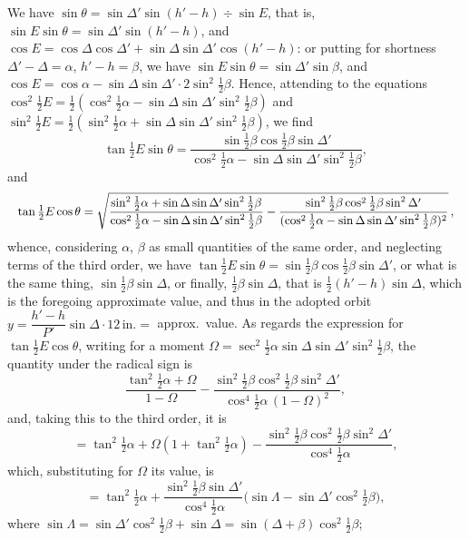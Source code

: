 \documentclass[11pt]{article}
\begin{document}
We have $\sin\theta = \sin\Delta'\sin(h'-h)\div\sin E$, that is,
$\sin E\sin\theta = \sin\Delta'\sin(h'-h)$, and
$\cos E = \cos\Delta\cos\Delta' + \sin\Delta\sin\Delta'\cos(h'-h)$: or
putting for shortness $\Delta'-\Delta = \alpha$, $h'-h = \beta$, we have
$\sin E\sin\theta = \sin\Delta'\sin\beta$, and
$\cos E = \cos\alpha - \sin\Delta\sin\Delta'\cdot 2\sin^{2}\tfrac{1}{2}\beta$.
Hence, attending to the equations
$\cos^{2}\tfrac{1}{2}E = \tfrac{1}{2}(\cos^{2}\tfrac{1}{2}\alpha - \sin\Delta\sin\Delta'\sin^{2}\tfrac{1}{2}\beta)$
and
$\sin^{2}\tfrac{1}{2}E = \tfrac{1}{2}(\sin^{2}\tfrac{1}{2}\alpha + \sin\Delta\sin\Delta'\sin^{2}\tfrac{1}{2}\beta)$,
we find
\[
\tan\tfrac{1}{2}E\sin\theta = \frac{\sin\tfrac{1}{2}\beta\cos\tfrac{1}{2}\beta\sin\Delta'}{\cos^{2}\tfrac{1}{2}\alpha - \sin\Delta\sin\Delta'\sin^{2}\tfrac{1}{2}\beta},
\]
and
\[
\resizebox{\textwidth}{!}{$\displaystyle
\tan\tfrac{1}{2}E\cos\theta = \sqrt{\frac{\sin^{2}\tfrac{1}{2}\alpha + \sin\Delta\sin\Delta'\sin^{2}\tfrac{1}{2}\beta}{\cos^{2}\tfrac{1}{2}\alpha - \sin\Delta\sin\Delta'\sin^{2}\tfrac{1}{2}\beta} - \frac{\sin^{2}\tfrac{1}{2}\beta\cos^{2}\tfrac{1}{2}\beta\sin^{2}\Delta'}{(\cos^{2}\tfrac{1}{2}\alpha - \sin\Delta\sin\Delta'\sin^{2}\tfrac{1}{2}\beta)^{2}}}\,,$}
\]
whence, considering $\alpha$, $\beta$ as small quantities of the same
order, and neglecting terms of the third order, we have
$\tan\tfrac{1}{2}E\sin\theta = \sin\tfrac{1}{2}\beta\cos\tfrac{1}{2}\beta\sin\Delta'$,
or what is the same thing, $\sin\tfrac{1}{2}\beta\sin\Delta$, or finally,
$\tfrac{1}{2}\beta\sin\Delta$, that is $\tfrac{1}{2}(h'-h)\sin\Delta$,
which is the foregoing approximate value, and thus in the adopted orbit
$y = \dfrac{h'-h}{P'}\sin\Delta\cdot 12\,\text{in.} = $ approx.\ value. As
regards the expression for $\tan\tfrac{1}{2}E\cos\theta$, writing for a
moment
$\Omega = \sec^{2}\tfrac{1}{2}\alpha\sin\Delta\sin\Delta'\sin^{2}\tfrac{1}{2}\beta$,
the quantity under the radical sign is
\[
\frac{\tan^{2}\tfrac{1}{2}\alpha + \Omega}{1 - \Omega} - \frac{\sin^{2}\tfrac{1}{2}\beta\cos^{2}\tfrac{1}{2}\beta\sin^{2}\Delta'}{\cos^{4}\tfrac{1}{2}\alpha\,(1-\Omega)^{2}},
\]
and, taking this to the third order, it is
\[
= \tan^{2}\tfrac{1}{2}\alpha + \Omega(1 + \tan^{2}\tfrac{1}{2}\alpha) - \frac{\sin^{2}\tfrac{1}{2}\beta\cos^{2}\tfrac{1}{2}\beta\sin^{2}\Delta'}{\cos^{4}\tfrac{1}{2}\alpha},
\]
which, substituting for $\Omega$ its value, is
\[
= \tan^{2}\tfrac{1}{2}\alpha + \frac{\sin^{2}\tfrac{1}{2}\beta\sin\Delta'}{\cos^{4}\tfrac{1}{2}\alpha}\bigl(\sin\Lambda - \sin\Delta'\cos^{2}\tfrac{1}{2}\beta\bigr),
\]
where $\sin\Lambda = \sin\Delta'\cos^{2}\tfrac{1}{2}\beta + \sin\Delta = \sin(\Delta+\beta)\cos^{2}\tfrac{1}{2}\beta$;
\end{document}
